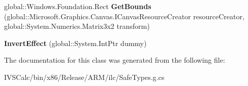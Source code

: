 \begin{DoxyCompactItemize}
\mbox{\label{class_microsoft_1_1_graphics_1_1_canvas_1_1_effects_1_1_invert_effect_a74ffdb0e709635a8916e51a009e69928}} 
global\+::\+Windows.\+Foundation.\+Rect {\bfseries Get\+Bounds} (global\+::\+Microsoft.\+Graphics.\+Canvas.\+I\+Canvas\+Resource\+Creator resource\+Creator, global\+::\+System.\+Numerics.\+Matrix3x2 transform)
\item 
\mbox{\label{class_microsoft_1_1_graphics_1_1_canvas_1_1_effects_1_1_invert_effect_a22f313595335226f5fa4bd22ccbe50de}} 
{\bfseries Invert\+Effect} (global\+::\+System.\+Int\+Ptr dummy)
\end{DoxyCompactItemize}


The documentation for this class was generated from the following file\+:\begin{DoxyCompactItemize}
\item 
I\+V\+S\+Calc/bin/x86/\+Release/\+A\+R\+M/ilc/Safe\+Types.\+g.\+cs\end{DoxyCompactItemize}
